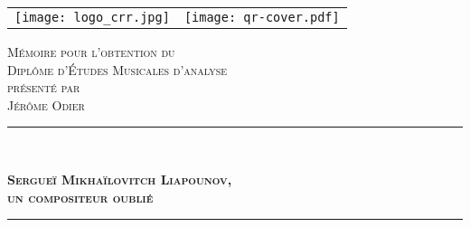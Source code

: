 
\begin{titlepage}
\begin{bigcenter}


\begin{tabular}{lr}
  \begin{minipage}{0.75\linewidth}
    \vspace{0mm}
    \texttt{[image: logo\_crr.jpg]}
  \end{minipage}
  &
  \begin{minipage}{0.25\linewidth}
    \vspace{7mm}
    \texttt{[image: qr-cover.pdf]}
  \end{minipage}
\end{tabular}


\vspace*{3.5cm}


\textsc{\large Mémoire pour l'obtention du}\\[0.2cm]
\textsc{\Large Diplôme d'Études Musicales d'analyse}\\[0.2cm]
\textsc{\large présenté par}\\[0.2cm]
\textsc{\Large Jérôme Odier}


\vspace{2.5cm}


\begin{minipage}{1.0\linewidth}
  \rule{\linewidth}{0.5mm}\\
  \begin{bigcenter}
    \textsc{\bfseries\huge Sergueï Mikhaïlovitch Liapounov,}\\[0.5cm]
    \textsc{\bfseries\huge un compositeur oublié}\\[0.5cm]
  \end{bigcenter}
  \rule{\linewidth}{0.5mm}\\
\end{minipage}


\end{bigcenter}
\end{titlepage}
